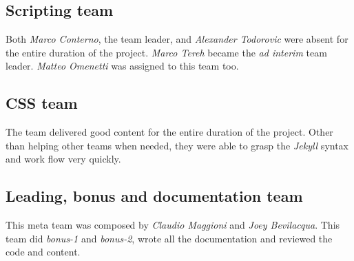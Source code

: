 \documentclass[hidelinks,12pt,a4paper,numbers=enddot]{scrartcl}
\begin{document}
\subsection{Scripting team}
Both \textit{Marco Conterno}, the team leader, and \textit{Alexander Todorovic} were absent for the entire duration of 
the project. \textit{Marco Tereh} became the \emph{ad interim} team leader. \textit{Matteo Omenetti} was assigned
to this team too.

\subsection{CSS team}
The team delivered good content for the entire duration of the project. Other than helping other teams when needed, they
were able to grasp the \textit{Jekyll} syntax and work flow very quickly.

\subsection{Leading, bonus and documentation team}
This meta team was composed by \textit{Claudio Maggioni} and \textit{Joey Bevilacqua}. This team did \textit{bonus-1} and
\textit{bonus-2}, wrote all the documentation and reviewed the code and content.
\end{document}
